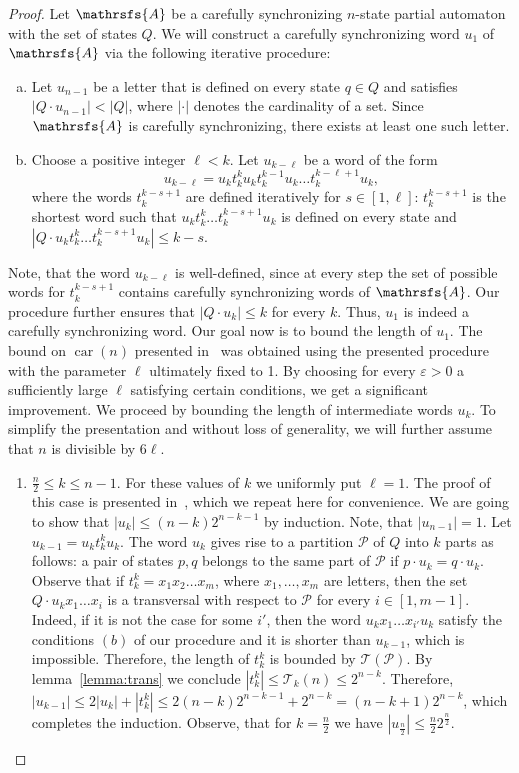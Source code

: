 \documentclass[a4paper,USenglish]{lipics}
\DeclareMathOperator{\car}{car}
\theoremstyle{definition}
\begin{document}
\begin{proof}
Let $\mathrsfs{A}$ be a carefully synchronizing $n$-state partial automaton with the set of states $Q$.
We will construct a carefully synchronizing word $u_1$ of $\mathrsfs{A}$ via the following iterative procedure:
\begin{enumerate}[(a)]
\item Let $u_{n-1}$ be a letter that is defined on every state $q \in Q$ and satisfies $|Q \cdot u_{n-1}| < |Q|$, where $|\cdot|$ denotes the cardinality of a set. Since $\mathrsfs{A}$ is carefully synchronizing, there exists at least one such letter.
\item Choose a positive integer $\ell < k$. Let $u_{k-\ell}$ be a word of the form 
$$ u_{k-\ell} = u_k t^k_{k} u_k t^{k-1}_k u_k \ldots t^{k - \ell+1}_k u_k, $$
where the words $t_k^{k-s+1}$ are defined iteratively for $s\in [1,\ell]$: $t_k^{k-s+1}$ is the shortest word such that $u_{k}t_k^k \ldots t_k^{k-s+1}u_k$ is defined on every state and $|Q \cdot u_{k}t_k^k \ldots t_k^{k-s+1}u_k| \leq k - s$. 
\end{enumerate}
Note, that the word $u_{k-\ell}$ is well-defined, since at every step the set of possible words for $t_k^{k-s+1}$ contains carefully synchronizing words of $\mathrsfs{A}$. Our procedure further ensures that $|Q \cdot u_k|\leq k$ for every $k$. Thus, $u_1$ is indeed a carefully synchronizing word. Our goal now is to bound the length of $u_1$.
The bound on $\car(n)$ presented in~\cite{Ivan2009} was obtained using the presented procedure with the parameter $\ell$ ultimately fixed to 1. By choosing for every $\varepsilon>0$ a sufficiently large $\ell$ satisfying certain conditions, we get a significant improvement. We proceed by bounding the length of intermediate words $u_k$. To simplify the presentation and without loss of generality, we will further assume that $n$ is divisible by $6\ell$.
\begin{enumerate}
\item $\frac{n}{2} \leq k \leq n-1$. For these values of $k$ we uniformly put $\ell=1$. The proof of this case is presented in~\cite[Proposition 7]{Ivan2009}, which we repeat here for convenience.
We are going to show that $|u_k| \leq (n - k) 2^{n-k-1}$ by induction. Note, that $|u_{n-1}| = 1$. Let $u_{k-1} = u_k t_k^k u_{k}$.
The word $u_k$ gives rise to a partition $\mathscr{P}$ of $Q$ into $k$ parts as follows: a pair of states $p,q$ belongs to the same part of $\mathscr{P}$ if $p\cdot u_k = q \cdot u_k$. Observe that if $t_k^k=x_1x_2\ldots x_m$, where $x_1,\ldots,x_m$ are letters, then the set $Q \cdot u_k x_1\ldots x_i$ is a transversal with respect to $\mathscr{P}$ for every $i \in [1,m-1]$. Indeed, if it is not the case for some $i'$, then the word $u_k x_1 \ldots x_{i'}u_k$ satisfy the conditions $(b)$ of our procedure and it is shorter than $u_{k-1}$, which is impossible. Therefore, the length of $t_k^k$ is bounded by $\mathscr{T}(\mathscr{P})$. By lemma~\ref{lemma:trans} we conclude $|t_k^k| \leq \mathscr{T}_k(n) \leq 2^{n-k}$. Therefore, $|u_{k-1}| \leq 2 |u_k| + |t_k^k| \leq 2 (n - k) 2^{n-k-1} + 2^{n-k} = (n - k + 1)2^{n-k}$, which completes the induction. Observe, that for $k = \tfrac{n}{2}$ we have $|u_{\frac{n}{2}}| \leq \tfrac{n}{2} 2^{\frac{n}{2}}$.


\end{enumerate}
\end{proof}
\end{document}

